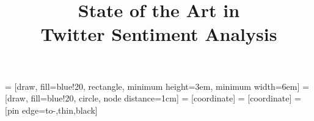 \documentclass{acm_proc_article-sp}
\begin{document}
 = [draw, fill=blue!20, rectangle, 
    minimum height=3em, minimum width=6em]
 = [draw, fill=blue!20, circle, node distance=1cm]
 = [coordinate]
 = [coordinate]
 = [pin edge={to-,thin,black}]

\title{State of the Art in \\ {\ttlit Twitter Sentiment Analysis}}


%
%
%
%
%
\end{document}
